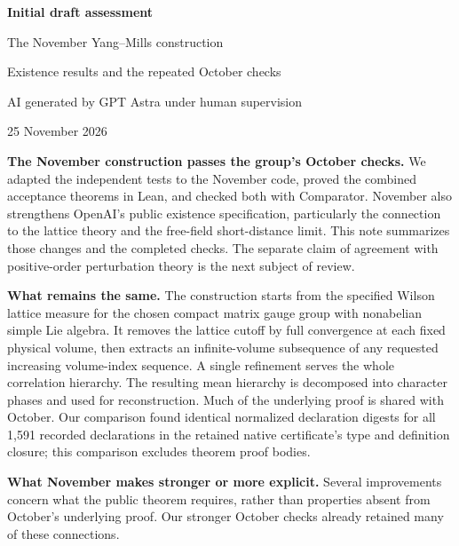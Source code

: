 \documentclass[11pt]{article}
\begin{document}
\begin{center}
{\large\bfseries Initial draft assessment}\par
{\large The November Yang--Mills construction}\par
{\small Existence results and the repeated October checks}\par
{\small AI generated by GPT Astra under human supervision}\par
{\small 25 November 2026}
\end{center}

\textbf{The November construction passes the group's October checks.}
We adapted the independent tests to the November code, proved the combined
acceptance theorems in Lean, and checked both with Comparator. November also
strengthens OpenAI's public existence specification, particularly the
connection to the lattice theory and the free-field short-distance limit.
This note summarizes those changes and the completed checks. The separate
claim of agreement with positive-order perturbation theory is the next
subject of review.

\textbf{What remains the same.}
The construction starts from the specified Wilson lattice measure for the
chosen compact matrix gauge group with nonabelian simple Lie algebra. It
removes the lattice cutoff by full convergence at each fixed physical
volume, then extracts an infinite-volume subsequence of any requested
increasing volume-index sequence. A single refinement serves the whole
correlation hierarchy. The resulting mean hierarchy is decomposed into
character phases and used for reconstruction. Much of the underlying proof
is shared with October. Our comparison found identical normalized
declaration digests for all 1,591 recorded declarations in the retained
native certificate's type and definition closure; this comparison excludes
theorem proof bodies.

\textbf{What November makes stronger or more explicit.}
Several improvements concern what the public theorem requires, rather than
properties absent from October's underlying proof. Our stronger October
checks already retained many of these connections.
\end{document}
